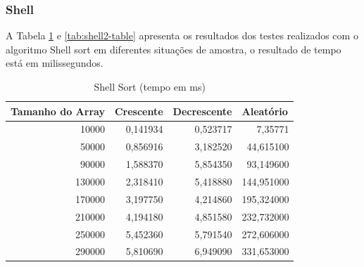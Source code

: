 \documentclass[a4paper, 12pt]{article}
\begin{document}
\subsubsection{Shell}
A Tabela \ref{tab:shell1-table} e \ref{tab:shell2-table}  apresenta os resultados dos testes realizados com o algoritmo Shell sort em diferentes situações de amostra, o resultado de tempo está em milissegundos.

		\begin{longtable}[c]{@{}rrrr@{}}
			\caption{Shell Sort (tempo em ms)}
			\label{tab:shell1-table}\\
			\toprule
			\multicolumn{1}{l}{\textbf{Tamanho do Array}} & \multicolumn{1}{l}{\textbf{Crescente}} & \multicolumn{1}{l}{\textbf{Decrescente}} & \multicolumn{1}{l}{\textbf{Aleatório}} \\* \midrule
			\endfirsthead
			\endhead
			\multicolumn{1}{|r|}{10000}                   & \multicolumn{1}{r|}{0,141934}          & \multicolumn{1}{r|}{0,523717}            & \multicolumn{1}{r|}{7,35771}           \\* \midrule
			\multicolumn{1}{|r|}{50000}                   & \multicolumn{1}{r|}{0,856916}          & \multicolumn{1}{r|}{3,182520}            & \multicolumn{1}{r|}{44,615100}         \\* \midrule
			\multicolumn{1}{|r|}{90000}                   & \multicolumn{1}{r|}{1,588370}          & \multicolumn{1}{r|}{5,854350}            & \multicolumn{1}{r|}{93,149600}         \\* \midrule
			\multicolumn{1}{|r|}{130000}                  & \multicolumn{1}{r|}{2,318410}          & \multicolumn{1}{r|}{5,418880}            & \multicolumn{1}{r|}{144,951000}        \\* \midrule
			\multicolumn{1}{|r|}{170000}                  & \multicolumn{1}{r|}{3,197750}          & \multicolumn{1}{r|}{4,214860}            & \multicolumn{1}{r|}{195,324000}        \\* \midrule
			\multicolumn{1}{|r|}{210000}                  & \multicolumn{1}{r|}{4,194180}          & \multicolumn{1}{r|}{4,851580}            & \multicolumn{1}{r|}{232,732000}        \\* \midrule
			\multicolumn{1}{|r|}{250000}                  & \multicolumn{1}{r|}{5,452360}          & \multicolumn{1}{r|}{5,791540}            & \multicolumn{1}{r|}{272,606000}        \\* \midrule
			\multicolumn{1}{|r|}{290000}                  & \multicolumn{1}{r|}{5,810690}          & \multicolumn{1}{r|}{6,949090}            & \multicolumn{1}{r|}{331,653000}        \\* \midrule

\end{longtable}
\end{document}

